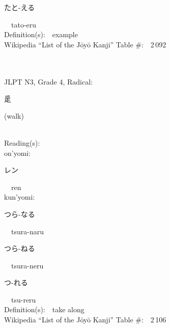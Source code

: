 \begin{multicols}{2}
{\hspace*{2em}}{\begin{CJK}{UTF8}{min} たと-える \end{CJK}}\ \ tato-eru\ \ \\
Definition(s):\ \ example \\
Wikipedia ``List of the J\=oy\=o Kanji'' Table \#:\ \ 2\,092 \\
\ \ \\
{\fontsize{34pt}{40pt}  }\ \ \\  %
{JLPT N3, Grade 4, Radical:\ \ {\begin{CJK}{UTF8}{min} 辵 \end{CJK}} (walk) } \\
Reading(s):\ \ \\
{\hspace*{1em}}on'yomi:\ \ \\
{\hspace*{2em}}{\begin{CJK}{UTF8}{min} レン \end{CJK}}\ \ ren\ \ \\
{\hspace*{1em}}kun'yomi:\ \ \\
{\hspace*{2em}}{\begin{CJK}{UTF8}{min} つら-なる \end{CJK}}\ \ tsura-naru\ \ \\
{\hspace*{2em}}{\begin{CJK}{UTF8}{min} つら-ねる \end{CJK}}\ \ tsura-neru\ \ \\
{\hspace*{2em}}{\begin{CJK}{UTF8}{min} つ-れる \end{CJK}}\ \ tsu-reru\ \ \\
Definition(s):\ \ take along \\
Wikipedia ``List of the J\=oy\=o Kanji'' Table \#:\ \ 2\,106 \\
\ \ \\
{\fontsize{34pt}{40pt}  }\ \ \\  %

\end{multicols}
